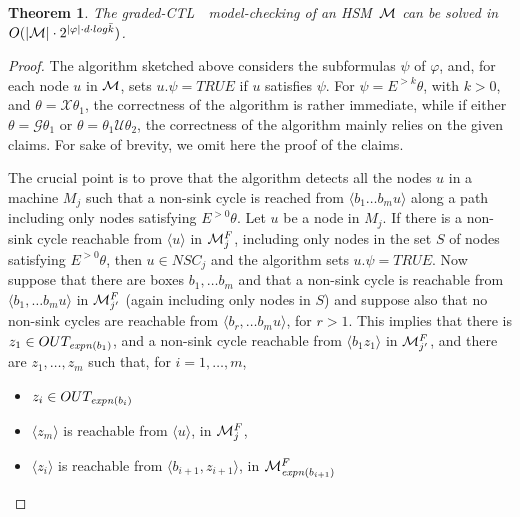 \documentclass[letterpaper,twocolumn,10pt]{article}
\newtheorem{theorem}{Theorem}
\def    \ctl        {\mbox{\textsc{CTL }\xspace}}
\def    \U          {\mathcal{U}}
\def    \G          {\mathcal{G}}
\def    \M          {{\cal M}}
\def    \X          {\mathcal{X}}
\newcommand{\HSM}{HSM}
\begin{document}
\begin{theorem}\label{theo:ghsmMc}
The graded-\ctl\ model-checking of an \HSM\ $\M$ can be solved in $O(|\M|
\cdot 2^{ |\varphi|\cdot d \cdot log\bar k })$.
\end{theorem}
\begin{proof}
The algorithm sketched above considers the subformulas $\psi$ of $\varphi$, and,
for each node $u$ in $\M$,   sets $u.\psi=TRUE$ if $u$ satisfies $\psi$.
For $\psi=E^{> k} \theta$, with $k > 0$, and $\theta=  \X \theta_1$, the correctness of the algorithm is rather immediate,
while if either  $\theta=  \G \theta_1$ or $\theta =\theta_1 \U \theta_2$,
the correctness of the  algorithm mainly relies on the given claims.
For sake of brevity, we omit here the proof of the claims.

The crucial point is to prove that the algorithm
detects all the nodes $u$ in a machine $M_j$ such that
 a non-sink cycle is reached from $ \langle b_1 \dots b_m u \rangle $  along a path  including only nodes satisfying $E^{>0} \theta$.
 Let $u$ be a node in $M_j$. If there is a  non-sink cycle  reachable
from $\langle u \rangle $ in  $\M_j^F$,
including only nodes in the set $S$ of nodes satisfying $E^{>0} \theta$, then $u \in  NSC_j$
and  the algorithm sets $u.\psi = TRUE$.
Now suppose that there are boxes $b_1,\dots b_m$ and that a  non-sink cycle is reachable from $\langle b_1,\dots b_m u \rangle $ in
$\M_{j'} ^F$ (again including only nodes in $S$) and suppose also that no non-sink cycles are reachable from
$\langle b_r,\dots b_m u \rangle $, for $r > 1$. This implies that
there is $z_1 \in OUT_{\mathit{expn}(b_1)}$,
and a  non-sink cycle  reachable from $\langle b_1 z_1 \rangle $ in  $\M_{j'} ^F$,
and
there are  $z_1,\dots,z_m$
 such that, for $i=1,\dots,m$,
\begin{itemize}
\item
$z_i \in OUT_{\mathit{expn}(b_i)}$
\item
 $\langle z_m \rangle$ is reachable from $\langle u\rangle$, in $\M_{j} ^F$,
\item
$\langle z_i \rangle$ is reachable from $\langle b_{i+1},z_{i+1} \rangle$, in $\M_{\expand(b_{i+1})} ^F$


\end{itemize}
\end{proof}
\end{document}
